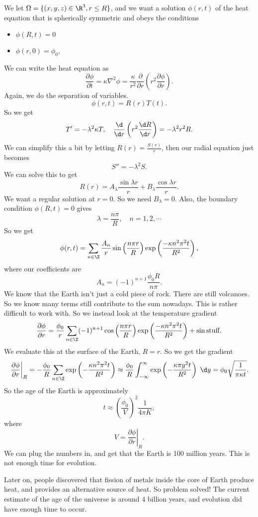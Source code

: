 \documentclass[a4paper]{article}
\begin{document}
\begin{eg}
  We let $\Omega = \{(x, y, z) \in \R^3, r \leq R\}$, and we want a solution $\phi(r, t)$ of the heat equation that is spherically symmetric and obeys the conditions
  \begin{itemize}
    \item $\phi(R, t) = 0$
    \item $\phi(r, 0) = \phi_0$,
  \end{itemize}
  We can write the heat equation as
  \[
    \frac{\partial \phi}{\partial t} = \kappa \nabla^2 \phi = \frac{\kappa}{r^2}\frac{\partial}{\partial r}\left(r^2 \frac{\partial \phi}{\partial r}\right).
  \]
  Again, we do the separation of variables.
  \[
    \phi(r, t) = R(r) T(t).
  \]
  So we get
  \[
    T' = -\lambda^2 \kappa T,\quad \frac{\d}{\d r}\left(r^2 \frac{\d R}{\d r}\right) = -\lambda^2 r^2 R.
  \]
  We can simplify this a bit by letting $R(r) = \frac{S(r)}{r}$, then our radial equation just becomes
  \[
    S'' = -\lambda^2 S.
  \]
  We can solve this to get
  \[
    R(r) = A_\lambda \frac{\sin \lambda r}{r} + B_\lambda \frac{\cos \lambda r}{r}.
  \]
  We want a regular solution at $r = 0$. So we need $B_\lambda = 0$. Also, the boundary condition $\phi(R, t) = 0$ gives
  \[
    \lambda = \frac{n\pi}{R},\quad n = 1, 2, \cdots
  \]
  So we get
  \[
    \phi(r, t) = \sum_{n \in \Z} \frac{A_n}{r} \sin\left(\frac{n\pi r}{R}\right) \exp\left(\frac{-\kappa n^2 \pi^2 t}{R^2}\right),
  \]
  where our coefficients are
  \[
    A_n = (-1)^{n + 1}\frac{\phi_0 R}{n\pi}.
  \]
  We know that the Earth isn't just a cold piece of rock. There are still volcanoes. So we know many terms still contribute to the sum nowadays. This is rather difficult to work with. So we instead look at the temperature gradient
  \[
    \frac{\partial \phi}{\partial r} = \frac{\phi_0}{r} \sum_{n \in \Z} (-1)^{n + 1} \cos \left(\frac{n\pi r}{R}\right) \exp\left(\frac{-\kappa n^2 \pi^2 t}{R^2}\right) + \sin\text{stuff}.
  \]
  We evaluate this at the surface of the Earth, $R = r$. So we get the gradient
  \[
    \left.\frac{\partial\phi}{\partial r}\right|_R = -\frac{\phi_0}{R} \sum_{n\in \Z} \exp\left(-\frac{\kappa n^2 \pi^2 t}{R^2}\right) \approx \frac{\phi_0}{R} \int_{-\infty}^\infty \exp\left(-\frac{\kappa \pi y^2 t}{R^2}\right)\;\d y = \phi_0 \sqrt{\frac{1}{\pi \kappa t}}.
  \]
  So the age of the Earth is approximately
  \[
    t \approx \left(\frac{\phi_0}{V}\right)^2 \frac{1}{4\pi K},
  \]
  where
  \[
    V = \left.\frac{\partial \phi}{\partial r}\right|_R.
  \]
  We can plug the numbers in, and get that the Earth is 100 million years. This is not enough time for evolution.

  Later on, people discovered that fission of metals inside the core of Earth produce heat, and provides an alternative source of heat. So problem solved! The current estimate of the age of the universe is around 4 billion years, and evolution did have enough time to occur.
\end{eg}
\end{document}
